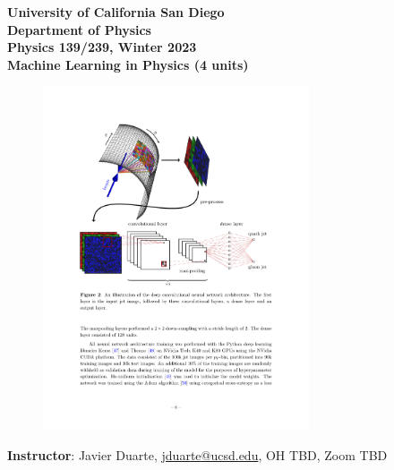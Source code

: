 \documentclass[12pt]{article}
\begin{document}
\begin{center}
  \textbf{University of California San Diego\\
    Department of Physics\\
    Physics 139/239, Winter 2023\\
    Machine Learning in Physics (4 units)}
\end{center}

\begin{figure}[h!]
  \centering
  \includegraphics[width=0.7\textwidth]{quark_gluon.pdf}
\end{figure}

\noindent\textbf{Instructor}: Javier Duarte, \href{mailto:jduarte@ucsd.edu}{jduarte@ucsd.edu}, OH TBD, Zoom TBD

\end{document}
